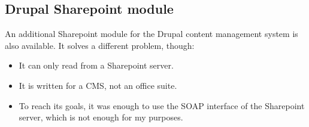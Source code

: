 \subsection*{Drupal Sharepoint module}

An additional Sharepoint module\cite{drupal-sp} for the Drupal content management system is also available. It solves a different problem, though:

\begin{itemize}
\item It can only read from a Sharepoint server.
\item It is written for a CMS, not an office suite.
\item To reach its goals, it was enough to use the SOAP interface of the
Sharepoint server, which is not enough for my purposes.
\end{itemize}
